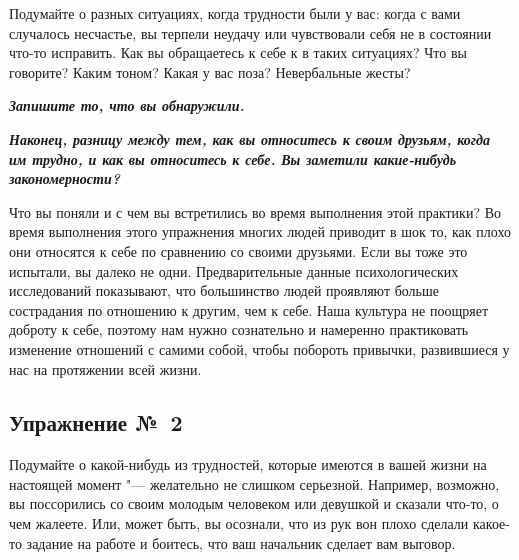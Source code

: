 Подумайте о разных ситуациях, когда трудности были у вас: когда с вами случалось несчастье, вы терпели неудачу или чувствовали себя не в состоянии что-то исправить. Как вы обращаетесь к себе к в таких ситуациях? Что вы говорите? Каким тоном? Какая у вас поза? Невербальные жесты?

\vspace{2ex}

\textbf{\textit{Запишите то, что вы обнаружили.}}

\vfill

\textbf{\textit{Наконец, разницу между тем, как вы относитесь к своим друзьям, когда им трудно, и как вы относитесь к себе. Вы заметили какие-нибудь закономерности?}}

\vfill


\newpage



\vspace{3ex}

Что вы поняли и с чем вы встретились во время выполнения этой практики?
Во время выполнения этого упражнения многих людей приводит в шок то, как плохо они относятся к себе по сравнению со своими друзьями. Если вы тоже это испытали, вы далеко не одни. Предварительные данные психологических исследований показывают, что большинство людей проявляют больше сострадания по отношению к другим, чем к себе. Наша культура не поощряет доброту к себе, поэтому нам нужно сознательно и намеренно практиковать изменение отношений с самими собой, чтобы побороть привычки, развившиеся у нас на протяжении всей жизни.


\newpage


\subsection{Упражнение №~2}


\vspace{3ex}

Подумайте о какой-нибудь из трудностей, которые имеются в вашей жизни на настоящей момент "--- желательно не слишком серьезной. Например, возможно, вы поссорились со своим молодым человеком или девушкой и сказали что-то, о чем жалеете. Или, может быть, вы осознали, что из рук вон плохо сделали какое-то задание на работе и боитесь, что ваш начальник сделает вам выговор.

